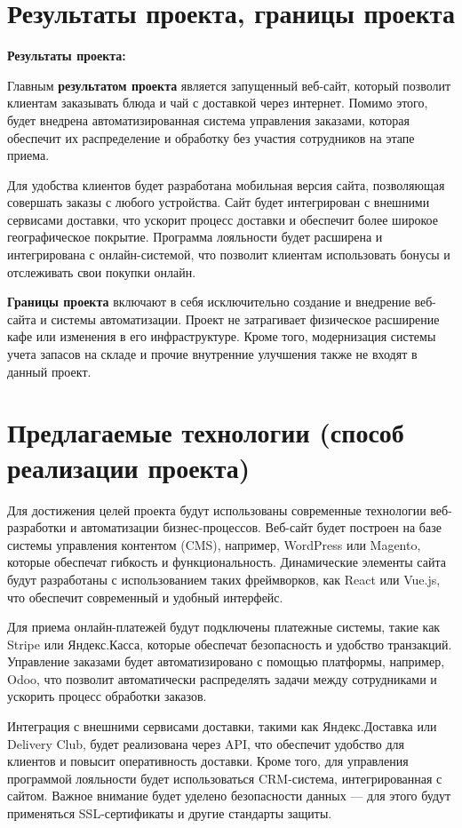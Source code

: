 \section{Результаты проекта, границы проекта}

\textbf{Результаты проекта:}

Главным \textbf{результатом проекта} является запущенный веб-сайт,
который позволит клиентам заказывать блюда и чай с доставкой через интернет.
Помимо этого, будет внедрена автоматизированная система управления заказами,
которая обеспечит их распределение
и обработку без участия сотрудников на этапе приема.

Для удобства клиентов будет разработана мобильная версия сайта,
позволяющая совершать заказы с любого устройства.
Сайт будет интегрирован с внешними сервисами доставки,
что ускорит процесс доставки и обеспечит более широкое географическое покрытие.
Программа лояльности будет расширена и интегрирована с онлайн-системой,
что позволит клиентам использовать бонусы и отслеживать свои покупки онлайн.

\textbf{Границы проекта} включают в себя исключительно создание
и внедрение веб-сайта и системы автоматизации.
Проект не затрагивает физическое расширение кафе
или изменения в его инфраструктуре.
Кроме того, модернизация системы учета запасов на складе
и прочие внутренние улучшения также не входят в данный проект.

\section{Предлагаемые технологии (способ реализации проекта)}

Для достижения целей проекта будут использованы современные
технологии веб-разработки и автоматизации бизнес-процессов.
Веб-сайт будет построен на базе системы управления контентом (CMS),
например, WordPress или Magento, которые обеспечат гибкость и функциональность.
Динамические элементы сайта будут разработаны
с использованием таких фреймворков, как React или Vue.js,
что обеспечит современный и удобный интерфейс.

Для приема онлайн-платежей будут подключены платежные системы,
такие как Stripe или Яндекс.Касса, которые обеспечат безопасность
и удобство транзакций. Управление заказами будет автоматизировано
с помощью платформы, например, Odoo,
что позволит автоматически распределять задачи между сотрудниками
и ускорить процесс обработки заказов.

Интеграция с внешними сервисами доставки,
такими как Яндекс.Доставка или Delivery Club,
будет реализована через API,
что обеспечит удобство для клиентов и повысит оперативность доставки.
Кроме того, для управления программой лояльности
будет использоваться CRM-система, интегрированная с сайтом.
Важное внимание будет уделено безопасности данных
--- для этого будут применяться SSL-сертификаты и другие стандарты защиты.


